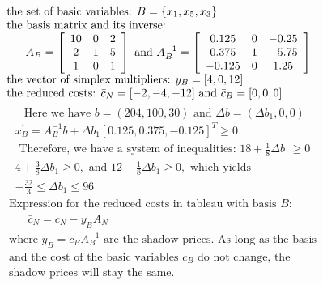 \documentclass{article}
\begin{document}
$$
\begin{array} { l c } { \text { the set of basic variables: } B = \left\{ x _ { 1 } , x _ { 5 } , x _ { 3 } \right\} } \\ { \text { the basis matrix and its inverse: } } \\ { \qquad A _ { B } = \left[ \begin{array} { c c c c } { 10 } & { 0 } & { 2 } \\ { 2 } & { 1 } & { 5 } \\ { 1 } & { 0 } & { 1 } \end{array} \right] \text { and } A _ { B } ^ { - 1 } = \left[ \begin{array} { c c c } { 0.125 } & { 0 } & { - 0.25 } \\ { 0.375 } & { 1 } & { - 5.75 } \\ { - 0.125 } & { 0 } & { 1.25 } \end{array} \right] } \\ { \text { the vector of simplex multipliers: } y _ { B } = [ 4,0,12 ] } & { } \\ { \text { the reduced costs: } \bar { c } _ { N } = [ - 2 , - 4 , - 12 ] \text { and } \bar { c } _ { B } = [ 0,0,0 ] } \end{array}
$$
$$
\text { Here we have } b = ( 204,100,30 ) \text { and } \Delta b = \left( \Delta b _ { 1 } , 0,0 \right)
$$
$$
\begin{array} { c } { x _ { B } ^ { \prime } = A _ { B } ^ { - 1 } b + \Delta b _ { 1 } [ 0.125,0.375 , - 0.125 ] ^ { T } \geqslant 0 } \\ { \text { Therefore, we have a system of inequalities: } 18 + \frac { 1 } { 8 } \Delta b _ { 1 } \geqslant 0 } \\ { 4 + \frac { 3 } { 8 } \Delta b _ { 1 } \geqslant 0 , \text { and } 12 - \frac { 1 } { 8 } \Delta b _ { 1 } \geqslant 0 , \text { which yields } } \\ { - \frac { 32 } { 3 } \leqslant \Delta b _ { 1 } \leqslant 96 } \end{array}
$$
$$
\begin{array} { l } { \text { Expression for the reduced costs in tableau with basis } B : } \\ { \qquad \bar { c } _ { N } = c _ { N } - y _ { B } A _ { N } } \\ { \text { where } y _ { B } = c _ { B } A _ { B } ^ { - 1 } \text { are the shadow prices. As long as the basis } } \\ { \text { and the cost of the basic variables } c _ { B } \text { do not change, the } } \\ { \text { shadow prices will stay the same. } } \end{array}
$$
\end{document}
